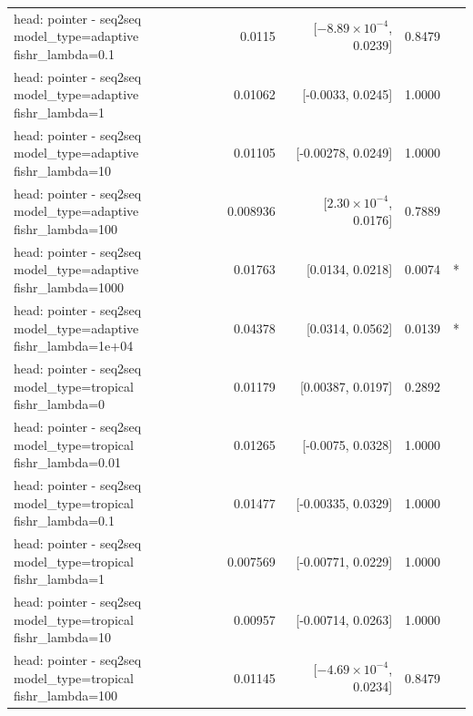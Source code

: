 \documentclass[10pt]{article}
\makeatletter
\newcommand{\stackcell}[1]{\begin{tabular}[t]{@{}l@{}}#1\end{tabular}}
\makeatother
\begin{document}
{\begin{longtable}{lrrrl}
\stackcell{head: pointer - seq2seq\\\footnotesize model\_type=adaptive fishr\_lambda=0.1 } & 0.0115 & [$-8.89\times10^{-4}$, 0.0239] & 0.8479 & \\
\stackcell{head: pointer - seq2seq\\\footnotesize model\_type=adaptive fishr\_lambda=1 } & 0.01062 & [-0.0033, 0.0245] & 1.0000 & \\
\stackcell{head: pointer - seq2seq\\\footnotesize model\_type=adaptive fishr\_lambda=10 } & 0.01105 & [-0.00278, 0.0249] & 1.0000 & \\
\stackcell{head: pointer - seq2seq\\\footnotesize model\_type=adaptive fishr\_lambda=100 } & 0.008936 & [$2.30\times10^{-4}$, 0.0176] & 0.7889 & \\
\stackcell{head: pointer - seq2seq\\\footnotesize model\_type=adaptive fishr\_lambda=1000 } & 0.01763 & [0.0134, 0.0218] & 0.0074 & *\\
\stackcell{head: pointer - seq2seq\\\footnotesize model\_type=adaptive fishr\_lambda=1e+04 } & 0.04378 & [0.0314, 0.0562] & 0.0139 & *\\
\stackcell{head: pointer - seq2seq\\\footnotesize model\_type=tropical fishr\_lambda=0 } & 0.01179 & [0.00387, 0.0197] & 0.2892 & \\
\stackcell{head: pointer - seq2seq\\\footnotesize model\_type=tropical fishr\_lambda=0.01 } & 0.01265 & [-0.0075, 0.0328] & 1.0000 & \\
\stackcell{head: pointer - seq2seq\\\footnotesize model\_type=tropical fishr\_lambda=0.1 } & 0.01477 & [-0.00335, 0.0329] & 1.0000 & \\
\stackcell{head: pointer - seq2seq\\\footnotesize model\_type=tropical fishr\_lambda=1 } & 0.007569 & [-0.00771, 0.0229] & 1.0000 & \\
\stackcell{head: pointer - seq2seq\\\footnotesize model\_type=tropical fishr\_lambda=10 } & 0.00957 & [-0.00714, 0.0263] & 1.0000 & \\
\stackcell{head: pointer - seq2seq\\\footnotesize model\_type=tropical fishr\_lambda=100 } & 0.01145 & [$-4.69\times10^{-4}$, 0.0234] & 0.8479 & \\

\end{longtable}}
\end{document}
